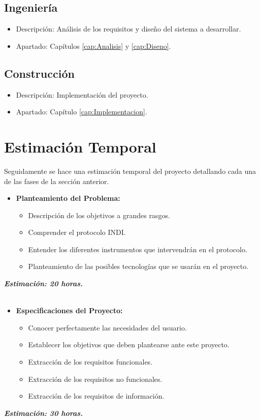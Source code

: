 \subsection{Ingeniería}
\begin{itemize}
  \item Descripción: Análisis de los requisitos y diseño del sistema a desarrollar.
  \item Apartado: Capítulos \ref{cap:Analisis} y \ref{cap:Diseno}.\\
\end{itemize}

\subsection{Construcción}
\begin{itemize}
  \item Descripción: Implementación del proyecto.
  \item Apartado: Capítulo \ref{cap:Implementacion}.\\
\end{itemize}


\section{Estimación Temporal}
Seguidamente se hace una estimación temporal del proyecto detallando cada una de las fases de la sección anterior.

\begin{itemize}
  \item \textbf{Planteamiento del Problema:}
  \begin{itemize}
    \item Descripción de los objetivos a grandes rasgos.
    \item Comprender el protocolo INDI.
    \item Entender los diferentes instrumentos que intervendrán en el protocolo.
    \item Planteamiento de las posibles tecnologías que se usarán en el proyecto.
  \end{itemize}
\end{itemize}
\textit{\textbf{Estimación: 20 horas.}}\\ \\

\begin{itemize}
  \item \textbf{Especificaciones del Proyecto:}
  \begin{itemize}
    \item Conocer perfectamente las necesidades del usuario.
    \item Establecer los objetivos que deben plantearse ante este proyecto.
    \item Extracción de los requisitos funcionales.
    \item Extracción de los requisitos no funcionales.
    \item Extracción de los requisitos de información.
  \end{itemize}
\end{itemize}
\textit{\textbf{Estimación: 30 horas.}}\\ \\

